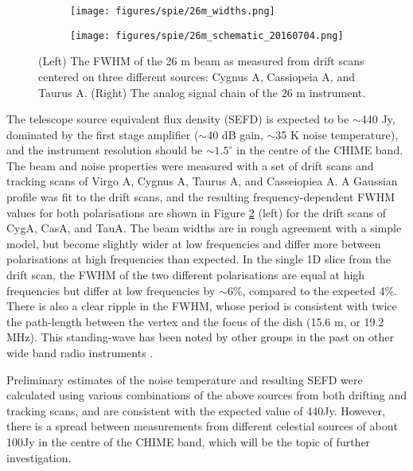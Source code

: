 \begin{figure}[h!] %
	\centering
	\begin{subfigure}[a]{0.42\textwidth}
		\vspace{-4in}
		\texttt{[image: figures/spie/26m\_widths.png]}%
	\end{subfigure}
	\begin{subfigure}[b]{0.56\textwidth}%
		\texttt{[image: figures/spie/26m\_schematic\_20160704.png]}%
		\label{signalchain}
	\end{subfigure}%
	\caption{(Left) The FWHM of the 26 m beam as measured from drift scans centered on three different sources: Cygnus A, Cassiopeia A, and Taurus A. (Right) The analog signal chain of the 26 m instrument.}
	\label{26mplot}
\end{figure}

The telescope source equivalent flux density (SEFD) is expected to be $\sim$440 Jy, dominated by the first stage amplifier ($\sim$40 dB gain, $\sim$35 K noise temperature), and the instrument resolution should be $\sim1.5^{\circ}$ in the centre of the CHIME band. The beam and noise properties were measured with a set of drift scans and tracking scans of Virgo A, Cygnus A, Taurus A, and Casseiopiea A. A Gaussian profile was fit to the drift scans, and the resulting frequency-dependent FWHM values for both polarisations are shown in Figure \ref{26mplot} (left) for the drift scans of CygA, CasA, and TauA. The beam widths are in rough agreement with a simple model, but become slightly wider at low frequencies and differ more between polarisations at high frequencies than expected. In the single 1D slice from the drift scan, the FWHM of the two different polarisations are equal at high frequencies but differ at low frequencies by $\sim$6\%, compared to the expected 4\%. There is also a clear ripple in the FWHM, whose period is consistent with twice the path-length between the vertex and the focus of the dish (15.6 m, or 19.2 MHz). This standing-wave has been noted by other groups in the past on other wide band radio instruments \citep{wander1, wander2}.

Preliminary estimates of the noise temperature and resulting SEFD were calculated using various combinations of the above sources from both drifting and tracking scans, and are consistent with the expected value of 440Jy. However, there is a spread between measurements from different celestial sources of about 100Jy in the centre of the CHIME band, which will be the topic of further investigation.

